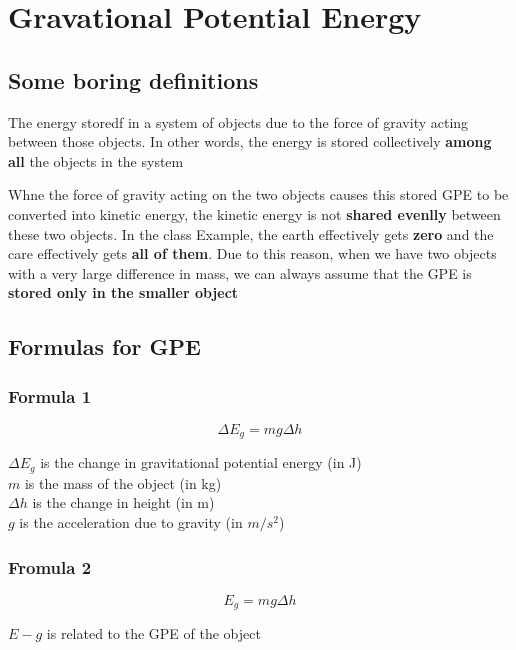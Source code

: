 \section{Gravational Potential Energy}
\subsection{Some boring definitions}
\begin{definition}
    The energy storedf in a system of objects due to the force of gravity acting between those objects. In other words, the energy is stored collectively \textbf{among all } the objects in the system
\end{definition}

Whne the force of gravity acting on the two objects causes this stored GPE to be converted into kinetic energy, the kinetic energy is not \textbf{shared evenlly} between these two objects. 
In the class Example, the earth effectively gets \textbf{zero} and the care effectively gets \textbf{all of them}. Due to this reason, when we have two objects with a very large difference in mass, we can 
always assume that the GPE is \textbf{stored only in the smaller object}

\subsection{Formulas for GPE}
\subsubsection*{Formula 1}
\begin{equation}
    \Delta E_g = mg\Delta h
\end{equation}

\begin{center}
    $\Delta E_g$ is the change in gravitational potential energy (in J)\\
    $m$ is the mass of the object (in kg)\\
    $\Delta h$ is the change in height (in m)\\
    $g$ is the acceleration due to gravity (in $m/s^2$)
\end{center}

\subsubsection*{Fromula 2}
\begin{equation}
    E_g = mg\Delta h
\end{equation}
\begin{center}
    $E-g$ is related to the GPE of the object
\end{center}

